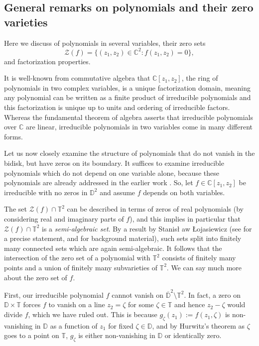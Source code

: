 \documentclass[11 pt,reqno]{amsart}
\theoremstyle{definition}
\theoremstyle{remark}
\numberwithin{equation}{section} \numberwithin{figure}{section}
\begin{document}
\subsection{General remarks on polynomials and their zero varieties} \label{polyremarks}
Here we discuss of polynomials in several variables, their
zero sets
\[\mathcal{Z}(f)=\{(z_1,z_2)\in \mathbb{C}^2\colon f(z_1,z_2)=0\},\]
and factorization properties. 

It is well-known from commutative algebra that $\mathbb{C}[z_1,z_2]$,
the ring of polynomials in two complex variables, is a unique
factorization domain, meaning any polynomial can be written
as a finite product of irreducible polynomials and this
factorization is unique up to units and ordering of irreducible
factors. Whereas the fundamental theorem of algebra asserts that
irreducible polynomials over $\mathbb{C}$ are linear, irreducible
polynomials in two variables come in many different forms.

Let us now closely examine the structure of polynomials that do not
vanish in the bidisk, but have zeros on its boundary.  It suffices to
examine irreducible polynomials which do not depend on one variable
alone, because these polynomials are already addressed in the earlier
work \cite{BCLSS13II}.  So, let $f \in {{\mathbb C}}[z_1,z_2]$ be irreducible with no zeros in
${{\mathbb D}}^2$ and assume $f$ depends on both variables.

The set $\mathcal{Z}(f)\cap \mathbb{T}^2$ can be described in terms of
zeros of real polynomials (by considering real and imaginary parts of
$f$), and this implies in particular that $\mathcal{Z}(f)\cap
\mathbb{T}^2$ is a {\it semi-algebraic set}.  By a result by Stanis\l
aw \L ojasiewicz (see \cite[pp.1584-1585]{Loja1993} for a precise
statement, and \cite{Loja1993,KP02} for background material), such
sets split into finitely many connected sets which are again
semi-algebraic.  It follows that the intersection of the zero set of a
polynomial with $\mathbb{T}^2$ consists of finitely many points and a
union of finitely many subvarieties of $\mathbb{T}^2$.  We can say
much more about the zero set of $f$.

First, our irreducible polynomial $f$ cannot vanish on
$\overline{{\mathbb D}}^2\setminus {{\mathbb T}}^2$.  In fact, a zero on ${{\mathbb D}}\times {{\mathbb T}}$
forces $f$ to vanish on a line $z_2=\zeta$ for some $\zeta \in {{\mathbb T}}$
and hence $z_2-\zeta$ would divide $f$, which we have ruled out.
This is because $g_{\zeta} (z_1) := f(z_1,\zeta)$ is non-vanishing in ${{\mathbb D}}$ as
a function of $z_1$ for fixed $\zeta \in {{\mathbb D}}$, and by Hurwitz's theorem
as $\zeta$ goes to a point on ${{\mathbb T}}$, $g_\zeta$ is either non-vanishing
in ${{\mathbb D}}$ or identically zero.
\end{document}
